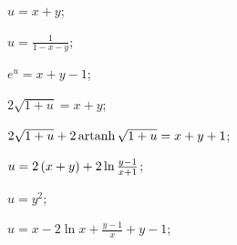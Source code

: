 \begin{enumsols}

		\label{sol:charpit_lagrange:cauchy_problems}
		\item \( u = x + y \); \sfill %
		\item \( u = \frac{1}{1 - x - y} \); \sfill %
		\item \( e^u = x + y - 1 \); \sfill %
		\item \( 2 \sqrt{1 + u} = x + y \); \sfill %
		\item \( 2 \sqrt{1 + u} + 2 \operatorname{artanh}{\sqrt{1 + u}} = x + y + 1 \); \sfill %
		\item \( u = 2 \left( x + y \right) + 2 \ln{\frac{y-1}{x+1}} \); \sfill %
		\item \( u = y^2 \); \sfill %
		\item \( u = x - 2\ln{x} + \frac{y - 1}{x} + y - 1 \); \sfill %
		
	\end{enumsols}


